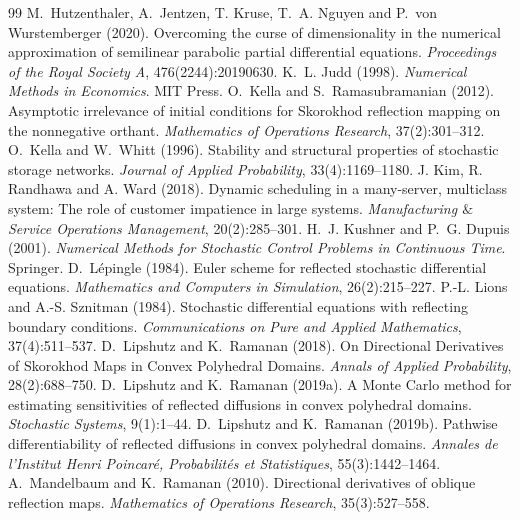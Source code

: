 \documentclass[11pt]{article}
\theoremstyle{definition}
\theoremstyle{plain}
\begin{document}
\begin{singlespace}
\begin{thebibliography}{99}
   M.~Hutzenthaler, A.~Jentzen, T. Kruse, T.~A. Nguyen and P.~von Wurstemberger (2020). \newblock Overcoming the curse of dimensionality in the numerical approximation of semilinear parabolic partial differential equations. \newblock \emph{Proceedings of the Royal Society A}, 476(2244):20190630. %
   K.~L. Judd (1998). \newblock \emph{Numerical Methods in Economics}. \newblock MIT Press.
O.~Kella and S.~Ramasubramanian (2012).
\newblock Asymptotic irrelevance of initial conditions for Skorokhod reflection mapping on the nonnegative orthant.
\newblock \emph{Mathematics of Operations Research}, 37(2):301--312.
O.~Kella and W.~Whitt (1996).
\newblock Stability and structural properties of stochastic storage networks.
\newblock \emph{Journal of Applied Probability}, 33(4):1169--1180.
   J. Kim, R. Randhawa and A. Ward (2018). \newblock Dynamic scheduling in a many-server, multiclass system: The role of customer impatience in large systems.  
  \newblock \emph{Manufacturing $\&$ Service Operations Management}, 20(2):285--301.
   H.~J. Kushner and P.~G. Dupuis (2001). \newblock \emph{Numerical Methods for Stochastic Control Problems in Continuous Time}. \newblock Springer.
D.~L\'epingle (1984).
\newblock Euler scheme for reflected stochastic differential equations.
\newblock \emph{Mathematics and Computers in Simulation}, 26(2):215--227.
   P.-L. Lions and A.-S. Sznitman (1984). \newblock Stochastic differential equations with reflecting boundary conditions. \newblock \emph{Communications on Pure and Applied Mathematics}, 37(4):511--537.
   D.~Lipshutz and K.~Ramanan (2018). \newblock On Directional Derivatives of Skorokhod Maps in Convex Polyhedral Domains. \newblock \emph{Annals of Applied Probability}, 28(2):688--750.
   D.~Lipshutz and K.~Ramanan (2019a). \newblock A Monte Carlo method for estimating sensitivities of reflected diffusions in convex polyhedral domains. \newblock \emph{Stochastic Systems}, 9(1):1--44.%
   D.~Lipshutz and K.~Ramanan (2019b). \newblock Pathwise differentiability of reflected diffusions in convex polyhedral domains. \newblock \emph{Annales de l'Institut Henri Poincar\'e, Probabilit\'es et Statistiques}, 55(3):1442--1464.%
   A.~Mandelbaum and K.~Ramanan (2010). \newblock Directional derivatives of oblique reflection maps. \newblock \emph{Mathematics of Operations Research}, 35(3):527--558.

\end{thebibliography}
\end{singlespace}
\end{document}
